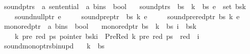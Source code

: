 \begin{isabellebody}
\isanewline
{}\isamarkupfalse%
\ sound{\isacharunderscore}{\kern0pt}ptrs\ {\isacharcolon}{\kern0pt}{\isacharcolon}{\kern0pt}\ {\isachardoublequoteopen}{\isacharprime}{\kern0pt}a\ sentential\ {\isasymRightarrow}\ {\isacharprime}{\kern0pt}a\ bins\ {\isasymRightarrow}\ bool{\isachardoublequoteclose}\ \isanewline
\ \ {\isachardoublequoteopen}sound{\isacharunderscore}{\kern0pt}ptrs\ {\isasymomega}\ bs\ {\isasymequiv}\ {\isasymforall}k\ {\isacharless}{\kern0pt}\ {\isacharbar}{\kern0pt}bs{\isacharbar}{\kern0pt}{\isachardot}{\kern0pt}\ {\isasymforall}e\ {\isasymin}\ set\ {\isacharparenleft}{\kern0pt}bs{\isacharbang}{\kern0pt}k{\isacharparenright}{\kern0pt}{\isachardot}{\kern0pt}\isanewline
\ \ \ \ sound{\isacharunderscore}{\kern0pt}null{\isacharunderscore}{\kern0pt}ptr\ e\ {\isasymand}\isanewline
\ \ \ \ sound{\isacharunderscore}{\kern0pt}pre{\isacharunderscore}{\kern0pt}ptr\ {\isasymomega}\ bs\ k\ e\ {\isasymand}\isanewline
\ \ \ \ sound{\isacharunderscore}{\kern0pt}prered{\isacharunderscore}{\kern0pt}ptr\ bs\ k\ e{\isachardoublequoteclose}\isanewline
\isanewline
{}\isamarkupfalse%
\ mono{\isacharunderscore}{\kern0pt}red{\isacharunderscore}{\kern0pt}ptr\ {\isacharcolon}{\kern0pt}{\isacharcolon}{\kern0pt}\ {\isachardoublequoteopen}{\isacharprime}{\kern0pt}a\ bins\ {\isasymRightarrow}\ bool{\isachardoublequoteclose}\ \isanewline
\ \ {\isachardoublequoteopen}mono{\isacharunderscore}{\kern0pt}red{\isacharunderscore}{\kern0pt}ptr\ bs\ {\isasymequiv}\ {\isasymforall}k\ {\isacharless}{\kern0pt}\ {\isacharbar}{\kern0pt}bs{\isacharbar}{\kern0pt}{\isachardot}{\kern0pt}\ {\isasymforall}i\ {\isacharless}{\kern0pt}\ {\isacharbar}{\kern0pt}bs{\isacharbang}{\kern0pt}k{\isacharbar}{\kern0pt}{\isachardot}{\kern0pt}\isanewline
\ \ \ \ {\isasymforall}k{\isacharprime}{\kern0pt}\ pre\ red\ ps{\isachardot}{\kern0pt}\ pointer\ {\isacharparenleft}{\kern0pt}bs{\isacharbang}{\kern0pt}k{\isacharbang}{\kern0pt}i{\isacharparenright}{\kern0pt}\ {\isacharequal}{\kern0pt}\ PreRed\ {\isacharparenleft}{\kern0pt}k{\isacharprime}{\kern0pt}{\isacharcomma}{\kern0pt}\ pre{\isacharcomma}{\kern0pt}\ red{\isacharparenright}{\kern0pt}\ ps\ {\isasymlongrightarrow}\ red\ {\isacharless}{\kern0pt}\ i{\isachardoublequoteclose}\isanewline
\isanewline
{}\isamarkupfalse%
\ sound{\isacharunderscore}{\kern0pt}mono{\isacharunderscore}{\kern0pt}ptrs{\isacharunderscore}{\kern0pt}bin{\isacharunderscore}{\kern0pt}upd{\isacharcolon}{\kern0pt}\isanewline
\ \ \ {\isachardoublequoteopen}k\ {\isacharless}{\kern0pt}\ {\isacharbar}{\kern0pt}bs{\isacharbar}{\kern0pt}{\isachardoublequoteclose}\isanewline

\end{isabellebody}

